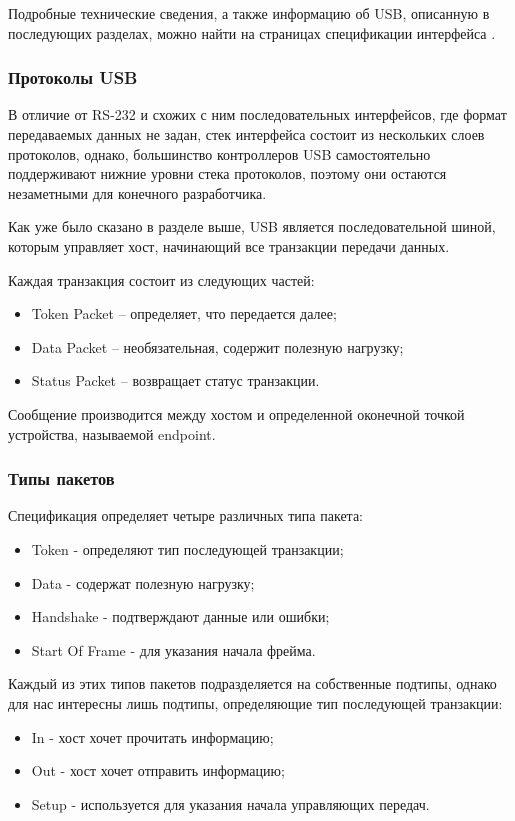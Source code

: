 Подробные технические сведения, а также информацию об USB, описанную
в последующих разделах, можно найти на страницах спецификации интерфейса \cite{usb}.

\subsubsection{Протоколы USB}

В отличие от RS-232 и схожих с ним последовательных интерфейсов, где формат
передаваемых данных не задан, стек интерфейса состоит из нескольких слоев протоколов,
однако, большинство контроллеров USB самостоятельно поддерживают нижние уровни стека протоколов,
поэтому они остаются незаметными для конечного разработчика.

Как уже было сказано в разделе выше, USB является последовательной шиной,
которым управляет хост, начинающий все транзакции передачи данных.

Каждая транзакция состоит из следующих частей:
\begin{itemize}
    \item Token Packet -- определяет, что передается далее;
    \item Data Packet -- необязательная, содержит полезную нагрузку;
    \item Status Packet -- возвращает статус транзакции.
\end{itemize}

Сообщение производится между хостом и определенной оконечной 
точкой устройства, называемой endpoint.

\subsubsection{Типы пакетов}

Спецификация определяет четыре различных типа пакета:
\begin{itemize}
    \item Token - определяют тип последующей транзакции;
    \item Data - содержат полезную нагрузку;
    \item Handshake - подтверждают данные или ошибки;
    \item Start Of Frame - для указания начала фрейма.
\end{itemize}

Каждый из этих типов пакетов подразделяется на собственные подтипы,
однако для нас интересны лишь подтипы, определяющие тип последующей транзакции:
\begin{itemize}
    \item In - хост хочет прочитать информацию;
    \item Out - хост хочет отправить информацию;
    \item Setup - используется для указания начала управляющих передач.
\end{itemize}

